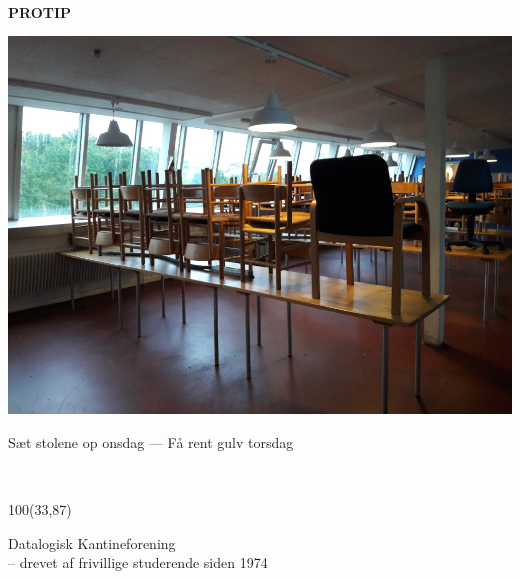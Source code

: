 \documentclass{article}
\begin{document}
~\vspace{1cm}

\Large

\begin{center}

\fontsize{20}{20}\selectfont

\textbf{PROTIP}

\vspace{0.3cm}

\includegraphics[scale=0.16]{billeder/stole-op.jpg}

\vspace{0.1cm}

\fontsize{15}{15}\selectfont

Sæt stolene op onsdag --- Få rent gulv torsdag

\end{center}


\normalsize

\vspace{\fill}

~

\begin{textblock}{100}(33,87)

\begin{flushright}
Datalogisk Kantineforening\\
-- drevet af frivillige studerende siden 1974
\end{flushright}

\end{textblock}
\end{document}
